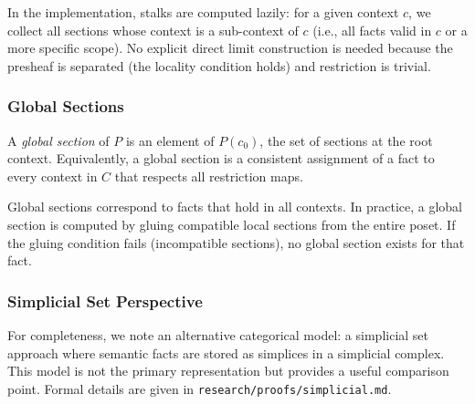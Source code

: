 In the implementation, stalks are computed lazily: for a given context \(c\),
we collect all sections whose context is a sub-context of \(c\) (i.e., all
facts valid in \(c\) or a more specific scope).  No explicit direct limit
construction is needed because the presheaf is separated (the locality
condition holds) and restriction is trivial.

\subsubsection{Global Sections}
\label{sec:global}

\begin{definition}
\label{def:globalsection-general}
A \emph{global section} of \(P\) is an element of \(P(c_0)\), the set of
sections at the root context.  Equivalently, a global section is a consistent
assignment of a fact to every context in \(C\) that respects all restriction
maps.
\end{definition}

Global sections correspond to facts that hold in all contexts.  In practice,
a global section is computed by gluing compatible local sections from the
entire poset.  If the gluing condition fails (incompatible sections), no
global section exists for that fact.

\subsubsection{Simplicial Set Perspective}
\label{sec:simplicial}

For completeness, we note an alternative categorical model: a simplicial set
approach where semantic facts are stored as simplices in a simplicial complex.
This model is not the primary representation but provides a useful comparison
point.  Formal details are given in \texttt{research/proofs/simplicial.md}.
